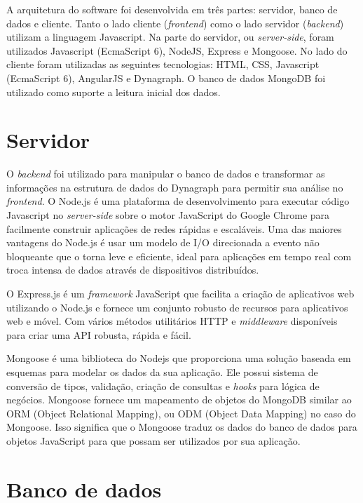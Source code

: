 \label{ap:tecnologias}

A arquitetura do software foi desenvolvida em três partes: servidor, banco de dados e cliente. Tanto o lado cliente (\textit{frontend}) como o lado servidor (\textit{backend})
utilizam a linguagem Javascript.
Na parte do servidor, ou \textit{server-side}, foram utilizados Javascript (EcmaScript 6), NodeJS, Express e Mongoose. No lado do cliente foram utilizadas as seguintes tecnologias:
HTML, CSS, Javascript (EcmaScript 6), AngularJS e Dynagraph. O banco de dados MongoDB foi utilizado como suporte a leitura inicial dos dados.


\section{Servidor}
O \textit{backend} foi utilizado para manipular o banco de dados e transformar as informações na estrutura de dados do Dynagraph para permitir sua análise no \textit{frontend}.
O Node.js é uma plataforma de desenvolvimento para executar código Javascript no \textit{server-side} sobre o motor JavaScript do Google Chrome para facilmente construir aplicações de redes rápidas e escaláveis. Uma das maiores vantagens do Node.js é usar um modelo de I/O direcionada a evento não bloqueante que o torna leve e eficiente, ideal para aplicações em tempo real com troca intensa de dados através de dispositivos distribuídos.

O Express.js é um \textit{framework} JavaScript que facilita a criação de aplicativos web utilizando o Node.js e fornece um conjunto robusto de recursos para aplicativos web e móvel. Com vários métodos utilitários HTTP e \textit{middleware} disponíveis para criar uma API robusta, rápida e fácil. 

Mongoose é uma biblioteca do Nodejs que proporciona uma solução baseada em esquemas para modelar os dados da sua aplicação. Ele possui sistema de conversão de tipos, validação, criação de consultas e \textit{hooks} para lógica de negócios. Mongoose fornece um mapeamento de objetos do MongoDB similar ao ORM (Object Relational Mapping), ou ODM (Object Data Mapping) no caso do Mongoose. Isso significa que o Mongoose traduz os dados do banco de dados para objetos JavaScript para que possam ser utilizados por sua aplicação.

\section{Banco de dados}

